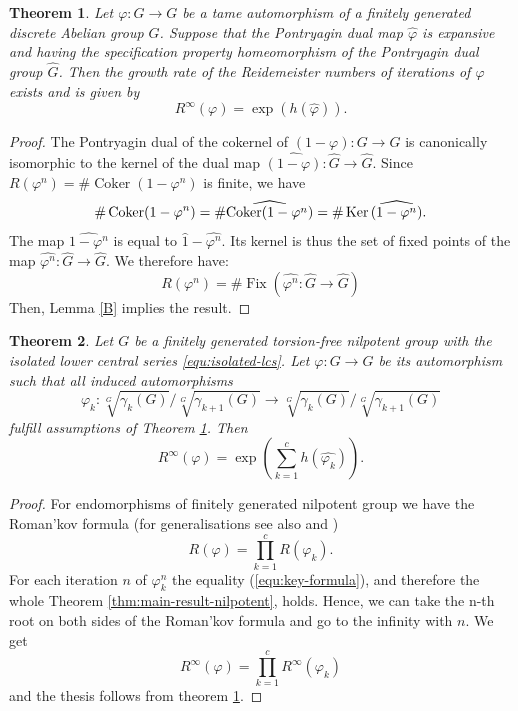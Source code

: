 \documentclass[12pt, a4paper]{amsart}
\def\Ker{\mathop{\rm Ker}\nolimits}
\def\Coker{\operatorname{Coker}}
\newcommand{\wh}[1]{\widehat{#1}}
\newtheorem{theorem}{Theorem}
\DeclareMathOperator{\fix}{Fix}
\begin{document}
\begin{theorem}\label{thm:reidem-entropy}
  Let $\varphi: G\to G$ be  a tame  automorphism of a finitely generated discrete Abelian group $G$.
  Suppose that the Pontryagin dual map  $\wh\varphi$ is expansive and having the specification property
  homeomorphism of the Pontryagin dual group $\wh G$.
  Then the growth rate of the  Reidemeister numbers of iterations of $\varphi$  exists and is given by
  \[
    R^{\infty}(\varphi)= \exp(h(\wh\varphi)).
  \]
\end{theorem}
\begin{proof}
  The Pontryagin dual of  the cokernel of $(1-\varphi):G\rightarrow G$ is canonically isomorphic to the
  kernel of the dual map $\widehat{(1-\varphi)}:\hat{G}\rightarrow \hat{G}$.
  Since $R(\varphi^n)=\#\Coker (1-\varphi^n)$ is finite, we have
  \[
    \#\Coker (1-\varphi^n) =\#\widehat{\Coker(1-\varphi^n)}= \#\Ker \widehat{(1-\varphi^n)} .
  \]
  The map $\widehat{1-\varphi^n}$ is equal to $\hat{1}-\hat{\varphi^n}$.
  Its kernel is thus the set of fixed points of the
  map $\hat{\varphi^n}:\hat{G}\rightarrow \hat{G}$.
  We therefore have:
  \begin{equation}
    R(\varphi^n) = \#\fix\left(\hat{\varphi^n}:\hat{G}\rightarrow \hat{G}\right)
  \end{equation}
  Then, Lemma \ref{B} implies the result.
\end{proof}


\begin{theorem}
  Let $G$ be a finitely generated torsion-free nilpotent group with the isolated lower central series
  \rm{\eqref{equ:isolated-lcs}}.
  Let $\varphi: G \to G$ be its automorphism such that all induced automorphisms
  \[
    \varphi_k: \sqrt[G]{\gamma_k(G)} / \sqrt[G]{\gamma_{k+1}(G)}
    \to \sqrt[G]{\gamma_k(G)} / \sqrt[G]{\gamma_{k+1}(G)}
  \]
  fulfill assumptions of \rm{Theorem \ref{thm:reidem-entropy}}. Then
  \[
    R^{\infty}(\varphi) = \exp \left( \sum_{k=1}^c h(\wh{\varphi_k}) \right).
  \]
\end{theorem}
\begin{proof}
  For endomorphisms of finitely generated nilpotent group we have the Roman'kov formula \cite{Rom}
  (for generalisations see also \cite[Theorem 6]{polyc} and \cite[Proposition 2.1]{FelsKlop})
  \[
    R(\varphi) = \prod_{k=1}^{c} R(\varphi_k).
  \]
  For each iteration $n$ of $\varphi_k^n$ the equality (\ref{equ:key-formula}),
  and therefore the whole Theorem \ref{thm:main-result-nilpotent}, holds.
  Hence, we can take the n-th root on both sides of the Roman'kov formula
  and go to the infinity with $n$.
  We get
  \[
    R^\infty(\varphi) = \prod_{k=1}^{c} R^\infty(\varphi_k)
  \]
  and the thesis follows from theorem \ref{thm:reidem-entropy}.
\end{proof}
\end{document}
